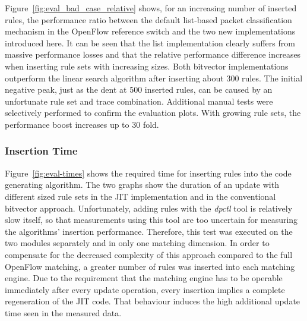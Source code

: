 \documentclass[conference]{IEEEtran}
\begin{document}
Figure~\ref{fig:eval_bad_case_relative} shows, for an increasing number of inserted rules,
the performance ratio between the default list-based packet classification mechanism in
the OpenFlow reference switch and the two new implementations introduced here.
It can be seen that the list implementation
clearly suffers from massive performance losses and that the relative 
performance difference increases when inserting rule sets with increasing sizes.
Both bitvector implementations outperform the linear search algorithm after inserting about 300 rules.
The initial negative peak, just as the dent at 500 inserted rules, can be caused by an unfortunate rule set and trace combination.
Additional manual tests were selectively performed to confirm the evaluation plots.
With growing rule sets, the performance boost increases up to 30 fold.

\subsubsection{Insertion Time}
\label{sec:eval-ins}
Figure~\ref{fig:eval-times} shows the required time for inserting rules into the code generating algorithm.
The two graphs show the duration of an update with different sized rule sets in the 
JIT implementation and in the conventional bitvector approach.
Unfortunately, adding rules with the \textit{dpctl} tool is relatively slow itself, so that measurements using this tool
are too uncertain for measuring the algorithms' insertion performance.
Therefore, this test was executed on the two modules separately and in only one matching dimension.
In order to compensate for the decreased complexity of this approach compared to the full OpenFlow matching,
a greater number of rules was inserted into each matching engine.
Due to the requirement that the matching engine has to be operable 
immediately after every update operation, every insertion implies a complete regeneration of the JIT code.
That behaviour induces the high additional update time seen in the measured data.
\end{document}
